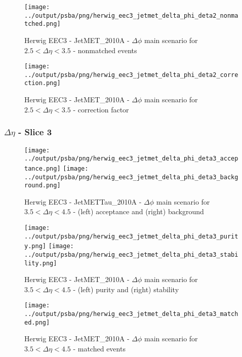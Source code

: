 \documentclass[11pt]{book}
\begin{document}
\begin{figure}[ht]
\centering
\texttt{[image: ../output/psba/png/herwig\_eec3\_jetmet\_delta\_phi\_deta2\_nonmatched.png]}
\caption{Herwig EEC3 - JetMET\_2010A - $\Delta\phi$ main scenario for $2.5 < \Delta\eta < 3.5$ - nonmatched events}
\label{fig:hw_eec3_jetmet_delta_phi_deta2_nonmatched}
\end{figure}

\begin{figure}[ht]
\centering
\texttt{[image: ../output/psba/png/herwig\_eec3\_jetmet\_delta\_phi\_deta2\_correction.png]}
\caption{Herwig EEC3 - JetMET\_2010A - $\Delta\phi$ main scenario for $2.5 < \Delta\eta < 3.5$ - correction factor}
\label{fig:hw_eec3_jetmet_delta_phi_deta2_correction}
\end{figure}

\clearpage
\subsubsection{$\Delta\eta$ - Slice 3}

\begin{figure}[ht]
\centering
\texttt{[image: ../output/psba/png/herwig\_eec3\_jetmet\_delta\_phi\_deta3\_acceptance.png]}
\texttt{[image: ../output/psba/png/herwig\_eec3\_jetmet\_delta\_phi\_deta3\_background.png]}
\caption{Herwig EEC3 - JetMETTau\_2010A - $\Delta\phi$ main scenario for $3.5 < \Delta\eta < 4.5$ - (left) acceptance and (right) background}
\label{fig:hw_eec3_jetmet_delta_phi_deta3_ab}
\end{figure}

\begin{figure}[ht]
\centering
\texttt{[image: ../output/psba/png/herwig\_eec3\_jetmet\_delta\_phi\_deta3\_purity.png]}
\texttt{[image: ../output/psba/png/herwig\_eec3\_jetmet\_delta\_phi\_deta3\_stability.png]}
\caption{Herwig EEC3 - JetMET\_2010A - $\Delta\phi$ main scenario for $3.5 < \Delta\eta < 4.5$ - (left) purity and (right) stability}
\label{fig:p6_jetmet_delta_phi_deta3_ps}
\end{figure}

\begin{figure}[ht]
\centering
\texttt{[image: ../output/psba/png/herwig\_eec3\_jetmet\_delta\_phi\_deta3\_matched.png]}
\caption{Herwig EEC3 - JetMET\_2010A - $\Delta\phi$ main scenario for $3.5 < \Delta\eta < 4.5$ - matched events}
\label{fig:hw_eec3_jetmet_delta_phi_deta3_matched}
\end{figure}
\end{document}
